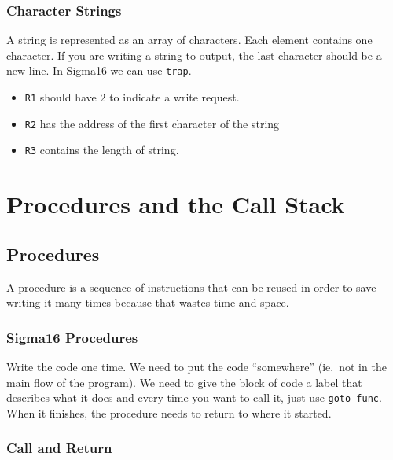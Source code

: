 \subsubsection{Character Strings}\label{ssub:character_strings}

A string is represented as an array of characters.
Each element contains one character.
If you are writing a string to output, the last character should be a new line.
In Sigma16 we can use \texttt{trap}.

\begin{itemize}
	\item \texttt{R1} should have \(2\) to indicate a write request.
	\item \texttt{R2} has the address of the first character of the string
	\item \texttt{R3} contains the length of string.
\end{itemize}

\section{Procedures and the Call Stack}\label{sec:procedures_and_the_call_stack}

\subsection{Procedures}\label{sub:procedures}

A procedure is a sequence of instructions that can be reused in order to save writing it many times because that wastes time and space.

\subsubsection{Sigma16 Procedures}\label{ssub:sigma16_procedures}

Write the code one time.
We need to put the code ``somewhere'' (ie.\ not in the main flow of the program).
We need to give the block of code a label that describes what it does and every time you want to call it, just use \texttt{goto func}.
When it finishes, the procedure needs to return to where it started.

\subsubsection{Call and Return}\label{ssub:call_and_return}

